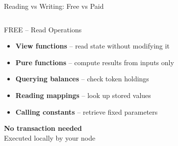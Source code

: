 \documentclass[8pt,aspectratio=169]{beamer}
\begin{document}
\begin{frame}{Reading vs Writing: Free vs Paid}
\begin{columns}[T]
\begin{block}{\textcolor{mlgreen}{FREE -- Read Operations}}
\footnotesize
\begin{itemize}
  \item \textbf{View functions} -- read state without modifying it
  \item \textbf{Pure functions} -- compute results from inputs only
  \item \textbf{Querying balances} -- check token holdings
  \item \textbf{Reading mappings} -- look up stored values
  \item \textbf{Calling constants} -- retrieve fixed parameters
\end{itemize}
\vspace{2mm}
\centering
\textcolor{mlgreen}{\textbf{No transaction needed}}\\
\footnotesize Executed locally by your node
\end{block}


\end{columns}
\end{frame}
\end{document}
